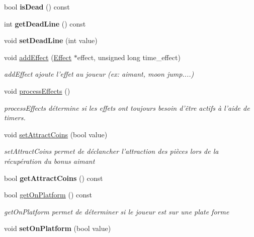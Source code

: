\begin{DoxyCompactItemize}
\item 
\hypertarget{class_player_model_acbf778cb90ceb16805b7570e2b729967}{bool {\bfseries is\+Dead} () const }\label{class_player_model_acbf778cb90ceb16805b7570e2b729967}

\item 
\hypertarget{class_player_model_aabec9a64736d7d968ee6bab4921c63a5}{int {\bfseries get\+Dead\+Line} () const }\label{class_player_model_aabec9a64736d7d968ee6bab4921c63a5}

\item 
\hypertarget{class_player_model_a1aa7d6d458729ca40dc0288c38ab08b3}{void {\bfseries set\+Dead\+Line} (int value)}\label{class_player_model_a1aa7d6d458729ca40dc0288c38ab08b3}

\item 
void \hyperlink{class_player_model_a47b3f3b6092b7af84e89dbfff86c674a}{add\+Effect} (\hyperlink{class_effect}{Effect} $\ast$effect, unsigned long time\+\_\+effect)
\begin{DoxyCompactList}\small\item\em add\+Effect ajoute l'effet au joueur (ex\+: aimant, moon jump....) \end{DoxyCompactList}\item 
\hypertarget{class_player_model_a055b6e208b1e0bdcbf3c10956dbe3aeb}{void \hyperlink{class_player_model_a055b6e208b1e0bdcbf3c10956dbe3aeb}{process\+Effects} ()}\label{class_player_model_a055b6e208b1e0bdcbf3c10956dbe3aeb}

\begin{DoxyCompactList}\small\item\em process\+Effects détermine si les effets ont toujours besoin d'être actifs à l'aide de timers. \end{DoxyCompactList}\item 
void \hyperlink{class_player_model_a1245be23eaab122437f1fcef4a9f1ad1}{set\+Attract\+Coins} (bool value)
\begin{DoxyCompactList}\small\item\em set\+Attract\+Coins permet de déclancher l'attraction des pièces lors de la récupération du bonus aimant \end{DoxyCompactList}\item 
\hypertarget{class_player_model_a431e7e78454d9c7ec5b0efd40df079bb}{bool {\bfseries get\+Attract\+Coins} () const }\label{class_player_model_a431e7e78454d9c7ec5b0efd40df079bb}

\item 
bool \hyperlink{class_player_model_a231f5950a3989ae05746129b8edd2dcf}{get\+On\+Platform} () const 
\begin{DoxyCompactList}\small\item\em get\+On\+Platform permet de déterminer si le joueur est sur une plate forme \end{DoxyCompactList}\item 
\hypertarget{class_player_model_a6888d2f5eecd34dda17b9ba6c37bacdc}{void {\bfseries set\+On\+Platform} (bool value)}\label{class_player_model_a6888d2f5eecd34dda17b9ba6c37bacdc}

\end{DoxyCompactItemize}
